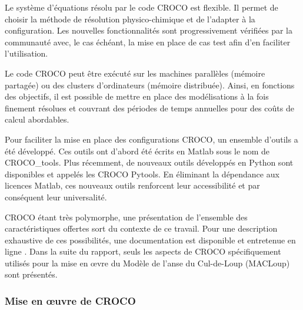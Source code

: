 \documentclass[10pt,a4paper,titlepage]{article}
\begin{document}
Le système d'équations résolu par le code CROCO est flexible.
Il permet de choisir la méthode de résolution physico-chimique et de l'adapter à la configuration.
Les nouvelles fonctionnalités sont progressivement vérifiées par la communauté avec, le cas échéant, la mise en place de cas test afin d'en faciliter l'utilisation.


Le code CROCO peut être exécuté sur les machines parallèles (mémoire partagée) ou des clusters d'ordinateurs (mémoire distribuée).
Ainsi, en fonctions des objectifs, il est possible de mettre en place des modélisations à la fois finement résolues et couvrant des périodes de temps annuelles pour des coûts de calcul abordables.

Pour faciliter la mise en place des configurations CROCO, un ensemble d'outils a été développé.
Ces outils ont d'abord été écrits en Matlab sous le nom de CROCO\_tools.
Plus récemment, de nouveaux outils développés en Python sont disponibles et appelés les CROCO Pytools.
En éliminant la dépendance aux licences Matlab, ces nouveaux outils renforcent leur accessibilité et par conséquent leur universalité.

CROCO étant très polymorphe, une présentation de l'ensemble des caractéristiques offertes sort du contexte de ce travail.
Pour une description exhaustive de ces possibilités, une documentation est disponible et entretenue en ligne \cite{documentation_croco}.
Dans la suite du rapport, seuls les aspects de CROCO spécifiquement utilisés pour la mise en \oe{}vre du Modèle de l'anse du Cul-de-Loup (MACLoup) sont présentés.


\subsubsection{Mise en \oe{}uvre de CROCO}
\label{subsub:presentation_generale}
\end{document}
